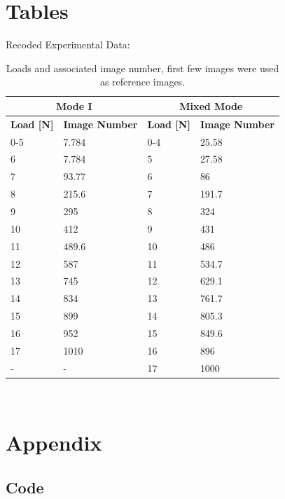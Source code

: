 \documentclass[12pt]{article}
\begin{document}
\section{Tables}
Recoded Experimental Data:
\begin{table}[h]\footnotesize
	\centering
	\begin{tabular}{ |l|l|l|l| }
		\hline
		\multicolumn{2}{|c|}{\textbf{Mode I}}&\multicolumn{2}{|c|}{\textbf{Mixed Mode}}\\ \hline
		\textbf{Load [N]} & \textbf{Image Number}&\textbf{Load [N]} & \textbf{Image Number}\\  \hline
		0-5 & 7.784 & 0-4 & 25.58 \\ \hline
		6& 7.784 & 5 & 27.58 \\ \hline
		7 & 93.77 & 6 & 86 \\ \hline
		8 & 215.6 & 7 &191.7 \\ \hline
		9 & 295 & 8 & 324 \\ \hline
		10 & 412 & 9 & 431 \\ \hline
		11 & 489.6 & 10 & 486 \\ \hline
		12 & 587 & 11 & 534.7 \\ \hline
		13 & 745 & 12 & 629.1 \\ \hline
		14 & 834 & 13 & 761.7 \\ \hline
		15 & 899 & 14 & 805.3 \\ \hline
		16 & 952 & 15 & 849.6 \\ \hline
		17 & 1010 & 16 & 896 \\ \hline
		-	& - & 17 & 1000 \\ \hline
		
		
		
	\end{tabular}
	\caption{Loads and associated image number, first few images were used as reference images.}
	\label{tab:data}
\end{table}
\
\section{Appendix}

\subsection{Code}

\begin{verbatim}

\end{verbatim}




\end{document}
